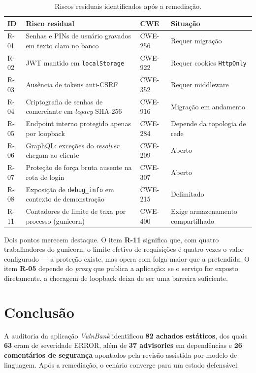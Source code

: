 \documentclass[12pt,a4paper]{article}
\begin{document}
\begin{table}[H]
\centering
\caption{Riscos residuais identificados após a remediação.}
\begin{tabularx}{\textwidth}{@{}lXll@{}}
\toprule
\textbf{ID} & \textbf{Risco residual} & \textbf{CWE} & \textbf{Situação} \\
\midrule
R-01 & Senhas e PINs de usuário gravados em texto claro no banco & CWE-256 & Requer migração \\
R-02 & JWT mantido em \texttt{localStorage} & CWE-922 & Requer cookies \texttt{HttpOnly} \\
R-03 & Ausência de tokens anti-CSRF & CWE-352 & Requer middleware \\
R-04 & Criptografia de senhas de comerciante em \emph{legacy} SHA-256 & CWE-916 & Migração em andamento \\
R-05 & Endpoint interno protegido apenas por loopback & CWE-284 & Depende da topologia de rede \\
R-06 & GraphQL: exceções do \emph{resolver} chegam ao cliente & CWE-209 & Aberto \\
R-07 & Proteção de força bruta ausente na rota de login & CWE-307 & Aberto \\
R-08 & Exposição de \texttt{debug\_info} em contexto de demonstração & CWE-215 & Delimitado \\
R-11 & Contadores de limite de taxa por processo (gunicorn) & CWE-400 & Exige armazenamento compartilhado \\
\bottomrule
\end{tabularx}
\end{table}

Dois pontos merecem destaque. O item \textbf{R-11} significa que, com quatro
trabalhadores do gunicorn, o limite efetivo de requisições é quatro vezes o
valor configurado --- a proteção existe, mas opera com folga maior que a
pretendida. O item \textbf{R-05} depende do \emph{proxy} que publica a
aplicação: se o serviço for exposto diretamente, a checagem de loopback deixa
de ser uma barreira suficiente.

\section{Conclusão}

A auditoria da aplicação \textit{VulnBank} identificou \textbf{82 achados
estáticos}, dos quais \textbf{63} eram de severidade \textsc{ERROR}, além de
\textbf{37 advisories} em dependências e \textbf{26 comentários de segurança}
apontados pela revisão assistida por modelo de linguagem. Após a remediação,
o cenário converge para um estado defensável:
\end{document}
